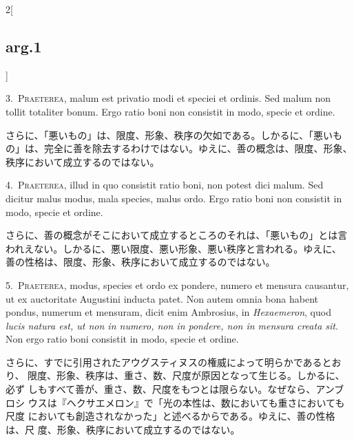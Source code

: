 \documentclass[paper=a4paper,fontsize=10pt,jafontsize=9pt,titlepage]{jlreq}
\begin{document}
\begin{paracol}{2}[\subsection{arg.1}]

3.~{\scshape Praeterea}, malum est privatio modi et speciei et ordinis. Sed
 malum non tollit totaliter bonum. Ergo ratio boni non consistit in
 modo, specie et ordine.

\switchcolumn

さらに、「悪いもの」は、限度、形象、秩序の欠如である。しかるに、「悪いも
 の」は、完全に善を除去するわけではない。ゆえに、善の概念は、限度、形象、
 秩序において成立するのではない。


4.~{\scshape Praeterea}, illud in quo consistit ratio boni, non potest dici
 malum. Sed dicitur malus modus, mala species, malus ordo. Ergo ratio
 boni non consistit in modo, specie et ordine.

\switchcolumn

さらに、善の概念がそこにおいて成立するところのそれは、「悪いもの」とは言
 われえない。しかるに、悪い限度、悪い形象、悪い秩序と言われる。ゆえに、
 善の性格は、限度、形象、秩序において成立するのではない。


5.~{\scshape Praeterea}, modus, species et ordo ex pondere, numero et
 mensura causantur, ut ex auctoritate Augustini inducta patet. Non autem
 omnia bona habent pondus, numerum et mensuram, dicit enim Ambrosius, in
 {\itshape Hexaemeron}, quod {\itshape lucis natura est, ut non in
 numero, non in pondere, non in mensura creata sit}. Non ergo ratio boni
 consistit in modo, specie et ordine.

\switchcolumn

さらに、すでに引用されたアウグスティヌスの権威によって明らかであるとおり、
 限度、形象、秩序は、重さ、数、尺度が原因となって生じる。しかるに、必ず
 しもすべて善が、重さ、数、尺度をもつとは限らない。なぜなら、アンブロシ
 ウスは『ヘクサエメロン』で「光の本性は、数においても重さにおいても尺度
 においても創造されなかった」と述べるからである。ゆえに、善の性格は、尺
 度、形象、秩序において成立するのではない。


\end{paracol}
\end{document}
